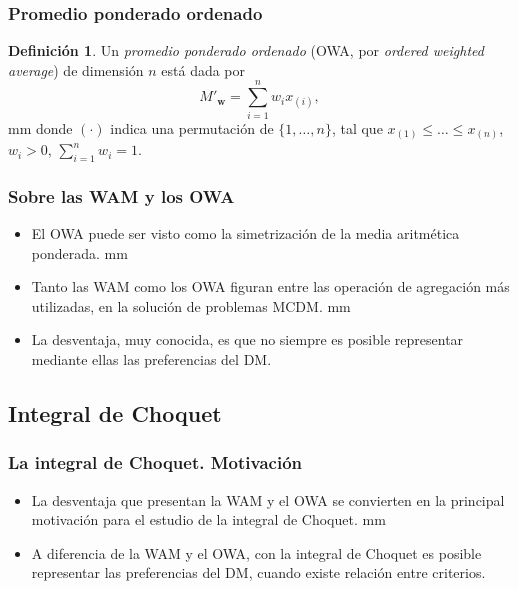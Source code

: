 \documentclass{beamer}
\theoremstyle{definition}
\newtheorem{Def}{Definición}
\begin{document}
\begin{frame}
  \frametitle{Promedio ponderado ordenado}
  \begin{Def}
    Un \emph{promedio ponderado ordenado} (OWA, por \emph{ordered weighted
      average}) de dimensión $n$ está dada por
    $$
    M'_{\mathbf{w}} = \sum_{i = 1}^n w_i x_{(i)},
    $$
     mm donde $(\cdot)$ indica una permutación de
    $\{ 1,\ldots , n\}$, tal que $x_{(1)} \le \ldots \le x_{(n)}$,
    $w_i > 0$, $\sum_{i=1}^n w_i = 1$.
  \end{Def}
\end{frame}

\begin{frame}
  \frametitle{Sobre las WAM y los OWA}
  \begin{itemize}
  \item El OWA puede ser visto como la simetrización de la media
    aritmética ponderada.   mm
  \item Tanto las WAM como los OWA figuran entre las operación de
    agregación más utilizadas, en la solución de problemas MCDM.
     mm
  \item La desventaja, muy conocida, es que no siempre es posible
    representar mediante ellas las preferencias del DM.
  \end{itemize}
\end{frame}

\subsection{Integral de Choquet}

\begin{frame}
  \frametitle{La integral de Choquet. Motivación}
  \begin{itemize}
  \item La desventaja que presentan la WAM y el OWA se convierten en
    la principal motivación para el estudio de la integral de Choquet.
     mm
  \item A diferencia de la WAM y el OWA, con la integral de Choquet es
    posible representar las preferencias del DM, cuando existe
    relación entre criterios.
  \end{itemize}
\end{frame}
\end{document}
